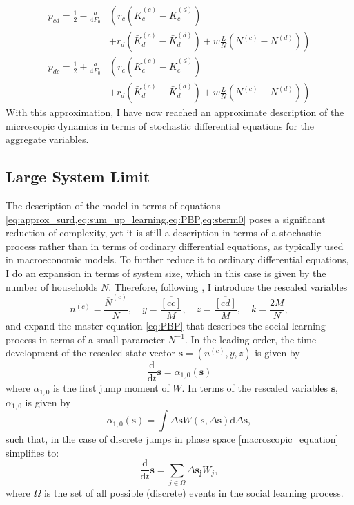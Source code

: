 \begin{align}
	p_{cd} = \frac{1}{2} - \frac{a}{4 F_0} &\left(r_c\left( \bar{K}_c^{(c)} - \bar{K}_c^{(d)} \right) \right. \nonumber \\ 
	& \left. + r_d\left( \bar{K}_d^{(c)} - \bar{K}_d^{(d)} \right) + w\frac{L}{N}\left( N^{(c)} - N^{(d)} \right) \right) \label{eq:approx_p_cd_final}\\
	p_{dc} = \frac{1}{2} + \frac{a}{4 F_0} &\left(r_c\left( \bar{K}_c^{(c)} - \bar{K}_c^{(d)} \right) \right. \nonumber \\ 
	& \left. + r_d\left( \bar{K}_d^{(c)} - \bar{K}_d^{(d)} \right) + w\frac{L}{N}\left( N^{(c)} - N^{(d)} \right) \right)  \label{eq:approx_p_dc_final}
\end{align}
With this approximation, I have now reached an approximate description of the microscopic dynamics in terms of stochastic differential equations for the aggregate variables.
\subsection{Large System Limit}
\label{sec:large_system_limit}
The description of the model in terms of equations \cref{eq:approx_surd,eq:sum_up_learning,eq:PBP,eq:sterm0} poses a significant reduction of complexity, yet it is still a description in terms of a stochastic process rather than in terms of ordinary differential equations, as typically used in macroeconomic models. To further reduce it to ordinary differential equations, I do an expansion in terms of system size, which in this case is given by the number of households $N$.
Therefore, following \citet[p. 244]{VanKampen1992}, I introduce the rescaled variables
\begin{equation}
  n^{(c)} = \frac{\overbar{N}^{(c)}}{N}, \quad y = \frac{\overbar{[cc]}}{M}, \quad z = \frac{\overbar{[cd]}}{M}, \quad k = \frac{2M}{N},
	\label{eq:rescalled_pbp_variables}
\end{equation}
and expand the master equation \cref{eq:PBP} that describes the social learning process in terms of a small parameter $N^{-1}$. In the leading order, the time development of the rescaled state vector $\mathbf{s} = (n^{(c)}, y, z)$ is given by 
\begin{equation}
	\frac{\mathrm{d}}{\mathrm{d}t}\mathbf{s} = \alpha_{1,0}(\mathbf{s})
	\label{macroscopic_equation}
\end{equation}
where $\alpha_{1,0}$ is the first jump moment of $W$. In terms of the rescaled variables $\mathbf{s}$, $\alpha_{1,0}$ is given by
\begin{equation}
	\alpha_{1,0}(\mathbf{s}) = \int \Delta \mathbf{s} W(s, \Delta \mathbf{s}) \mathrm{ d} \Delta \mathbf{s},
	\label{eq:jump_moment}
\end{equation}
such that, in the case of discrete jumps in phase space \cref{macroscopic_equation} simplifies to:
\begin{equation}
	\frac{\mathrm{d}}{\mathrm{d}t}\mathbf{s} = \sum_{j \in \Omega}  \Delta \mathbf{s_j} W_j,
	\label{eq:lsl_transitions}
\end{equation}
where $\Omega$ is the set of all possible (discrete) events in the social learning process.

